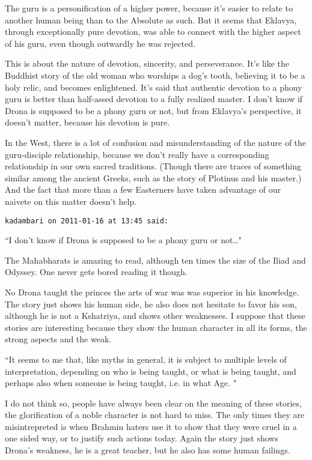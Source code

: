 \begin{footnotesize}
\begin{sffamily}
The guru is a personification of a higher power, because it's easier to relate to another human being than to the Absolute as such. But it seems that Eklavya, through exceptionally pure devotion, was able to connect with the higher aspect of his guru, even though outwardly he was rejected.

This is about the nature of devotion, sincerity, and perseverance. It's like the Buddhist story of the old woman who worships a dog's tooth, believing it to be a holy relic, and becomes enlightened. It's said that authentic devotion to a phony guru is better than half-assed devotion to a fully realized master. I don't know if Drona is supposed to be a phony guru or not, but from Eklavya's perspective, it doesn't matter, because his devotion is pure.

In the West, there is a lot of confusion and misunderstanding of the nature of the guru-disciple relationship, because we don't really have a corresponding relationship in our own sacred traditions. (Though there are traces of something similar among the ancient Greeks, such as the story of Plotinus and his master.) And the fact that more than a few Easterners have taken advantage of our naivete on this matter doesn't help.


\hfill

\texttt{kadambari on 2011-01-16 at 13:45 said: }

``I don't know if Drona is supposed to be a phony guru or not…"

The Mahabharats is amazing to read, although ten times the size of the Iliad and Odyssey. One never gets bored reading it though.

No Drona taught the princes the arts of war was was superior in his knowledge. The story just shows his human side, he also does not hesitate to favor his son, although he is not a Kshatriya, and shows other weaknesses. I suppose that these stories are interesting because they show the human character in all its forms, the strong aspects and the weak.

``It seems to me that, like myths in general, it is subject to multiple levels of interpretation, depending on who is being taught, or what is being taught, and perhaps also when someone is being taught, i.e. in what Age. "

I do not think so, people have always been clear on the meaning of these stories, the glorification of a noble character is not hard to miss. The only times they are misintrepreted is when Brahmin haters use it to show that they were cruel in a one sided way, or to justify such actions today. Again the story just shows Drona's weakness, he is a great teacher, but he also has some human failings.


\end{sffamily}\end{footnotesize}
